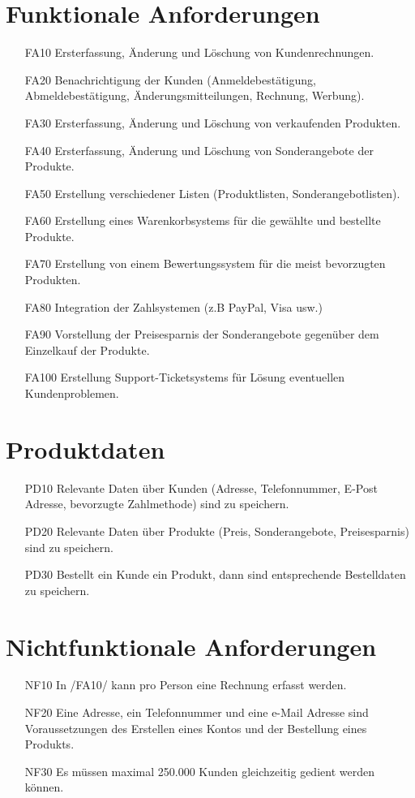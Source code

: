 \documentclass[parskip=full]{scrartcl}
\begin{document}
\section{Funktionale Anforderungen}
\begin{itemize}[nosep]
\item[FA10] Ersterfassung, Änderung und Löschung von Kundenrechnungen.
\item[FA20] Benachrichtigung der Kunden (Anmeldebestätigung, Abmeldebestätigung, Änderungsmitteilungen, Rechnung, Werbung).
\item[FA30] Ersterfassung, Änderung und Löschung von verkaufenden Produkten.
\item[FA40] Ersterfassung, Änderung und Löschung von Sonderangebote der Produkte.
\item[FA50] Erstellung verschiedener Listen (Produktlisten, Sonderangebotlisten).
\item[FA60] Erstellung eines Warenkorbsystems für die gewählte und bestellte Produkte.
\item[FA70] Erstellung von einem Bewertungssystem für die meist bevorzugten Produkten.
\item[FA80] Integration der Zahlsystemen (z.B PayPal, Visa usw.)
\item[FA90] Vorstellung der Preisesparnis der Sonderangebote gegenüber dem Einzelkauf der Produkte.
\item[FA100] Erstellung \gls{Support-Ticketsystem}s für Lösung eventuellen Kundenproblemen.
\end{itemize}

\section{Produktdaten}
\begin{itemize}[nosep]
\item[PD10] Relevante Daten über Kunden (Adresse, Telefonnummer, E-Post Adresse, bevorzugte Zahlmethode) sind zu speichern.
\item[PD20] Relevante Daten über Produkte (Preis, Sonderangebote, Preisesparnis) sind zu speichern. 
\item[PD30] Bestellt ein Kunde ein Produkt, dann sind entsprechende Bestelldaten zu speichern.
\end{itemize}

\section{Nichtfunktionale Anforderungen}
\begin{itemize}[nosep]
\item[NF10] In /FA10/ kann pro Person eine Rechnung erfasst werden.
\item[NF20] Eine Adresse, ein Telefonnummer und eine e-Mail Adresse sind Voraussetzungen des Erstellen eines Kontos und der Bestellung eines Produkts.
\item[NF30] Es müssen maximal 250.000 Kunden gleichzeitig gedient werden können.
\end{itemize}
\end{document}
